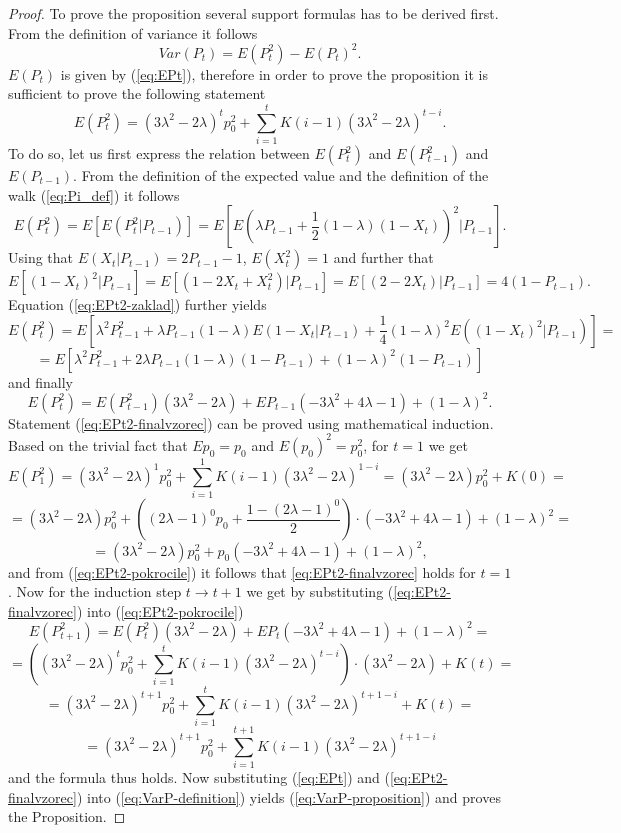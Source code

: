 \documentclass{amsart}
\theoremstyle{definition}
\theoremstyle{plain}
\theoremstyle{plain}
\theoremstyle{plain}
\numberwithin{equation}{section}
\begin{document}
\begin{proof}
To prove the proposition several support formulas has to be derived
first. From the definition of variance it follows
\begin{equation}
Var(P_{t})=E(P_{t}^{2})-E(P_{t})^{2}.\label{eq:VarP-definition}
\end{equation}
$E(P_{t})$ is given by (\ref{eq:EPt}), therefore in order to prove
the proposition it is sufficient to prove the following statement
\begin{equation}
E(P_{t}^{2})=(3\lambda^{2}-2\lambda)^{t}p_{0}^{2}+\sum_{i=1}^{t}K(i-1)(3\lambda^{2}-2\lambda)^{t-i}.\label{eq:EPt2-finalvzorec}
\end{equation}
To do so, let us first express the relation between $E(P_{t}^{2})$
and $E(P_{t-1}^{2})$ and $E(P_{t-1}).$ From the definition of the
expected value and the definition of the walk (\ref{eq:Pi_def}) it follows
\begin{equation}
E(P_{t}^{2})=E[E(P_{t}^{2}|P_{t-1})]=E[E(\lambda P_{t-1}+\frac{1}{2}(1-\lambda)(1-X_{t}))^{2}|P_{t-1}].\label{eq:EPt2-zaklad}
\end{equation}
Using that $E(X_{t}|P_{t-1})=2P_{t-1}-1$, $E(X_{t}^{2})=1$ and further
that
\[
E[(1-X_{t})^{2}|P_{t-1}]=E[(1-2X_{t}+X_{t}^{2})|P_{t-1}]
=E[(2-2X_{t})|P_{t-1}]= 4(1-P_{t-1}).
\]
Equation (\ref{eq:EPt2-zaklad}) further yields
\[
E(P_{t}^{2})=E[\lambda^{2}P_{t-1}^{2}+\lambda P_{t-1}(1-\lambda)E(1-X_{t}|P_{t-1})+\frac{1}{4}(1-\lambda)^{2}E((1-X_{t})^{2}|P_{t-1})]=
\]
\[
=E[\lambda^{2}P_{t-1}^{2}+2\lambda P_{t-1}(1-\lambda)(1-P_{t-1})+(1-\lambda)^{2}(1-P_{t-1})]
\]
 and finally
\begin{equation}
E(P_{t}^{2})=E(P_{t-1}^{2})(3\lambda^{2}-2\lambda)+EP_{t-1}(-3\lambda^{2}+4\lambda-1)+(1-\lambda)^{2}.\label{eq:EPt2-pokrocile}
\end{equation}
Statement (\ref{eq:EPt2-finalvzorec}) can be proved using mathematical induction.
Based on the trivial fact that $Ep_{0}=p_{0}$ and $E(p_{0})^{2}=p_{0}^{2}$,
for $t=1$ we get
\[
E(P_{1}^{2})=(3\lambda^{2}-2\lambda)^{1}p_{0}^{2}+\sum_{i=1}^{1}K(i-1)(3\lambda^{2}-2\lambda)^{1-i}=(3\lambda^{2}-2\lambda)p_{0}^{2}+K(0)=
\]
\[
=(3\lambda^{2}-2\lambda)p_{0}^{2}+((2\lambda-1)^{0}p_{0}+\frac{1-(2\lambda-1)^{0}}{2})\cdot(-3\lambda^{2}+4\lambda-1)+(1-\lambda)^{2}=
\]
\[
=(3\lambda^{2}-2\lambda)p_{0}^{2}+p_{0}(-3\lambda^{2}+4\lambda-1)+(1-\lambda)^{2},
\]
and from (\ref{eq:EPt2-pokrocile}) it follows that \eqref{eq:EPt2-finalvzorec}
holds for $t=1$. Now for the induction step $t\rightarrow t+1$ we get by substituting
(\ref{eq:EPt2-finalvzorec}) into (\ref{eq:EPt2-pokrocile})
\[
E(P_{t+1}^{2})=E(P_{t}^{2})(3\lambda^{2}-2\lambda)+EP_{t}(-3\lambda^{2}+4\lambda-1)+(1-\lambda)^{2}=
\]
\[
=((3\lambda^{2}-2\lambda)^{t}p_{0}^{2}+\sum_{i=1}^{t}K(i-1)(3\lambda^{2}-2\lambda)^{t-i})\cdot(3\lambda^{2}-2\lambda)+K(t)=
\]
\[
=(3\lambda^{2}-2\lambda)^{t+1}p_{0}^{2}+\sum_{i=1}^{t}K(i-1)(3\lambda^{2}-2\lambda)^{t+1-i}+K(t)=
\]
\[
=(3\lambda^{2}-2\lambda)^{t+1}p_{0}^{2}+\sum_{i=1}^{t+1}K(i-1)(3\lambda^{2}-2\lambda)^{t+1-i}
\]
and the formula thus holds. Now substituting (\ref{eq:EPt}) and (\ref{eq:EPt2-finalvzorec})
into (\ref{eq:VarP-definition}) yields (\ref{eq:VarP-proposition})
and proves the Proposition.
\end{proof}
\end{document}
